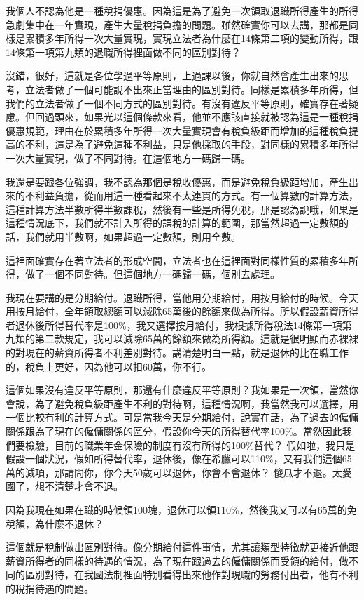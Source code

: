 \documentclass[oneside,sub3section]{ctexbook}
\begin{document}
我個人不認為他是一種稅捐優惠。因為這是為了避免一次領取退職所得產生的所得急劇集中在一年實現，產生大量稅捐負擔的問題。雖然確實你可以去講，那都是同樣是累積多年所得一次大量實現，實現立法者為什麼在14條第二項的變動所得，跟14條第一項第九類的退職所得裡面做不同的區別對待？

沒錯，很好，這就是各位學過平等原則，上過課以後，你就自然會產生出來的思考，立法者做了一個可能說不出來正當理由的區別對待。同樣是累積多年所得，但我們的立法者做了一個不同方式的區別對待。有沒有違反平等原則，確實存在著疑慮。但回過頭來，如果光以這個條款來看，他並不應該直接就被認為這是一種稅捐優惠規範，理由在於累積多年所得一次大量實現會有稅負級距而增加的這種稅負提高的不利，這是為了避免這種不利益，只是他採取的手段，對同樣的累積多年所得一次大量實現，做了不同對待。在這個地方一碼歸一碼。

我還是要跟各位強調，我不認為那個是稅收優惠，而是避免稅負級距增加，產生出來的不利益負擔，從而用這一種看起來不太連貫的方式。有一個算數的計算方法，這種計算方法半數所得半數課稅，然後有一些是所得免稅，那是認為說哦，如果是這種情況底下，我們就不計入所得的課稅的計算的範圍，那當然超過一定數額的話，我們就用半數啊，如果超過一定數額，則用全數。

這裡面確實存在著立法者的形成空間，立法者也在這裡面對同樣性質的累積多年所得，做了一個不同對待。但這個地方一碼歸一碼，個別去處理。

我現在要講的是分期給付。退職所得，當他用分期給付，用按月給付的時候。今天用按月給付，全年領取總額可以減除65萬後的餘額來做為所得。所以假設薪資所得者退休後所得替代率是100\%，我又選擇按月給付，我根據所得稅法14條第一項第九類的第二款規定，我可以減除65萬的餘額來做為所得額。這就是很明顯而赤裸裸的對現在的薪資所得者不利差別對待。講清楚明白一點，就是退休的比在職工作的，稅負上更好，因為他可以扣60萬，你不行。

這個如果沒有違反平等原則，那還有什麼違反平等原則？我如果是一次領，當然你會說，為了避免稅負級距產生不利的對待啊，這種情況啊，我當然我可以選擇，用一個比較有利的計算方式。可是當我今天是分期給付，說實在話，為了過去的僱傭關係跟為了現在的僱傭關係的區分，假設你今天的所得替代率100\%。當然因此我們要檢驗，目前的職業年金保險的制度有沒有所得的100\%替代？ 假如啦，我只是假設一個狀況，假如所得替代率，退休後，像在希臘可以110\%，又有我們這個65萬的減項，那請問你，你今天50歲可以退休，你會不會退休？ 傻瓜才不退。太愛國了，想不清楚才會不退。

因為我現在如果在職的時候領100塊，退休可以領110\%，然後我又可以有65萬的免稅額，為什麼不退休？

這個就是稅制做出區別對待。像分期給付這件事情，尤其讓類型特徵就更接近他跟薪資所得者的同樣的待遇的情況，為了現在跟過去的僱傭關係而受領的給付，做不同的區別對待，在我國法制裡面特別看得出來他作對現職的勞務付出者，他有不利的稅捐待遇的問題。
\end{document}
